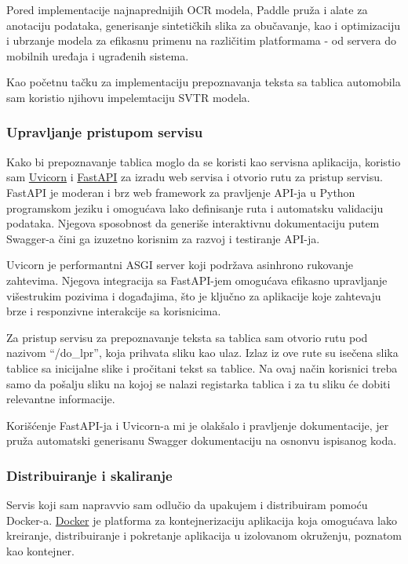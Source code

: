 \documentclass[a4paper,12pt]{article}
\begin{document}
	Pored implementacije najnaprednijih OCR modela, Paddle pruža i alate za anotaciju podataka, generisanje sintetičkih slika za obučavanje, kao i optimizaciju i ubrzanje modela za efikasnu primenu na različitim platformama - od servera do mobilnih uređaja i ugrađenih sistema.
	
	Kao početnu tačku za implementaciju prepoznavanja teksta sa tablica automobila sam koristio njihovu impelemtaciju SVTR modela.
	
	\subsubsection{Upravljanje pristupom servisu}
	Kako bi prepoznavanje tablica moglo da se koristi kao servisna aplikacija, koristio sam \href{https://www.uvicorn.org/}{Uvicorn} i \href{https://fastapi.tiangolo.com/}{FastAPI} za izradu web servisa i otvorio rutu za pristup servisu. FastAPI je moderan i brz web framework za pravljenje API-ja u Python programskom jeziku i omogućava lako definisanje ruta i automatsku validaciju podataka. Njegova sposobnost da generiše interaktivnu dokumentaciju putem Swagger-a čini ga izuzetno korisnim za razvoj i testiranje API-ja.
	
	Uvicorn je performantni ASGI server koji podržava asinhrono rukovanje zahtevima. Njegova integracija sa FastAPI-jem omogućava efikasno upravljanje višestrukim pozivima i događajima, što je ključno za aplikacije koje zahtevaju brze i responzivne interakcije sa korisnicima. 
	
	Za pristup servisu za prepoznavanje teksta sa tablica sam otvorio rutu pod nazivom \enquote{/do\_lpr}, koja prihvata sliku kao ulaz. Izlaz iz ove rute su isečena slika tablice sa inicijalne slike i pročitani tekst sa tablice. Na ovaj način korisnici treba samo da pošalju sliku na kojoj se nalazi registarka tablica i za tu sliku će dobiti relevantne informacije.
	
	Korišćenje FastAPI-ja i Uvicorn-a mi je olakšalo i pravljenje dokumentacije, jer pruža automatski generisanu Swagger dokumentaciju na osnonvu ispisanog koda.
	
	\subsubsection{Distribuiranje i skaliranje}
	Servis koji sam napravvio sam odlučio da upakujem i distribuiram pomoću Docker-a. \href{https://www.docker.com/}{Docker} je platforma za kontejnerizaciju aplikacija koja omogućava lako kreiranje, distribuiranje i pokretanje aplikacija u izolovanom okruženju, poznatom kao kontejner.
	
\end{document}
